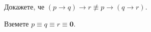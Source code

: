 \begin{framed}
\begin{problem}
  Докажете, че $(p\rightarrow q)\rightarrow r \not\equiv p\rightarrow (q\rightarrow r)$.
\end{problem}
\end{framed}
\begin{hint}
  Вземете $p \equiv q \equiv r \equiv \mathbf{0}$.
\end{hint}



    
